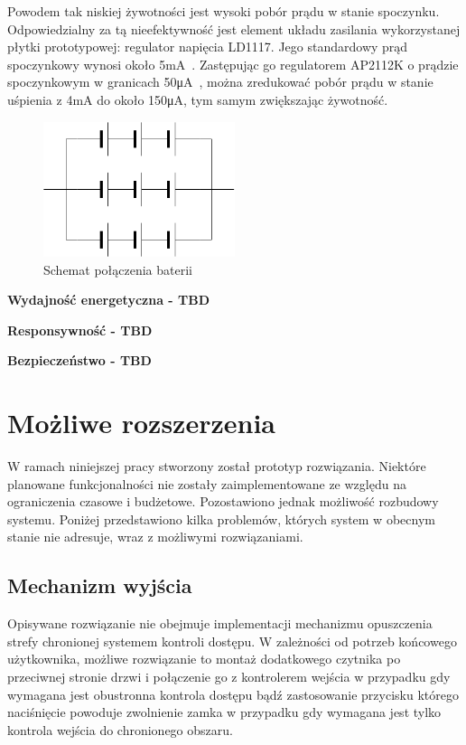     Powodem tak niskiej żywotności jest wysoki pobór prądu w stanie spoczynku. Odpowiedzialny za tą nieefektywność jest element układu zasilania wykorzystanej płytki prototypowej: regulator napięcia LD1117. Jego standardowy prąd spoczynkowy wynosi około 5mA~\cite{AMS1117-ds}. Zastępując go regulatorem AP2112K o prądzie spoczynkowym w granicach 50μA~\cite{AP2112K-ds}, można zredukować pobór prądu w stanie uśpienia z 4mA do około 150μA, tym samym zwiększając żywotność.

    \begin{figure}[]
        \centering
        \includegraphics[width=0.5\textwidth]{chapters/images/battery_layout.png}
        \caption{Schemat połączenia baterii}
        \label{fig:battery_layout}
    \end{figure}


	\textbf{Wydajność energetyczna - TBD}

	\textbf{Responsywność - TBD}

	\textbf{Bezpieczeństwo - TBD}

	\section{Możliwe rozszerzenia}

        W ramach niniejszej pracy stworzony został prototyp rozwiązania. Niektóre planowane funkcjonalności nie zostały zaimplementowane ze względu na ograniczenia czasowe i budżetowe. Pozostawiono jednak możliwość rozbudowy systemu. Poniżej przedstawiono kilka problemów, których system w obecnym stanie nie adresuje, wraz z możliwymi rozwiązaniami.

        \subsection{Mechanizm wyjścia}

            Opisywane rozwiązanie nie obejmuje implementacji mechanizmu opuszczenia strefy chronionej systemem kontroli dostępu. W zależności od potrzeb końcowego użytkownika, możliwe rozwiązanie to montaż dodatkowego czytnika po przeciwnej stronie drzwi i połączenie go z kontrolerem wejścia w przypadku gdy wymagana jest obustronna kontrola dostępu bądź zastosowanie przycisku którego naciśnięcie powoduje zwolnienie zamka w przypadku gdy wymagana jest tylko kontrola wejścia do chronionego obszaru.

